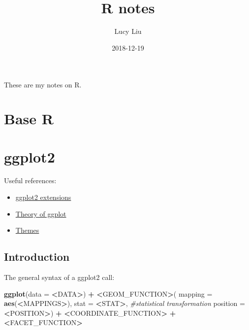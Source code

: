 \documentclass[]{book}
\title{R notes}
\author{Lucy Liu}
\date{2018-12-19}
\newenvironment{Shaded}{\begin{snugshade}}{\end{snugshade}}
\newcommand{\KeywordTok}[1]{\textcolor[rgb]{0.13,0.29,0.53}{\textbf{#1}}}
\newcommand{\DataTypeTok}[1]{\textcolor[rgb]{0.13,0.29,0.53}{#1}}
\newcommand{\StringTok}[1]{\textcolor[rgb]{0.31,0.60,0.02}{#1}}
\newcommand{\CommentTok}[1]{\textcolor[rgb]{0.56,0.35,0.01}{\textit{#1}}}
\newcommand{\OperatorTok}[1]{\textcolor[rgb]{0.81,0.36,0.00}{\textbf{#1}}}
\newcommand{\ErrorTok}[1]{\textcolor[rgb]{0.64,0.00,0.00}{\textbf{#1}}}
\newcommand{\NormalTok}[1]{#1}
\providecommand{\tightlist}{%
  \setlength{\itemsep}{0pt}\setlength{\parskip}{0pt}}
\begin{document}
\maketitle

{
\setcounter{tocdepth}{1}
\tableofcontents
}
These are my notes on R.

\chapter{Base R}\label{base-r}

\chapter{ggplot2}\label{ggplot2}

Useful references:

\begin{itemize}
\tightlist
\item
  \href{https://www.ggplot2-exts.org}{ggplot2 extensions}
\item
  \href{http://ggplot2.tidyverse.org/reference/}{Theory of ggplot}
\item
  \href{https://rstudio-pubs-static.s3.amazonaws.com/3364_d1a578f521174152b46b19d0c83cbe7e.html}{Themes}
\end{itemize}

\section{Introduction}\label{introduction}

The general syntax of a ggplot2 call:

\begin{Shaded}
\begin{Highlighting}[]
\KeywordTok{ggplot}\NormalTok{(}\DataTypeTok{data =} \OperatorTok{<}\NormalTok{DATA}\OperatorTok{>}\NormalTok{) }\OperatorTok{+}\StringTok{ }
\StringTok{  }\ErrorTok{<}\NormalTok{GEOM_FUNCTION}\OperatorTok{>}\NormalTok{(}
     \DataTypeTok{mapping =} \KeywordTok{aes}\NormalTok{(}\OperatorTok{<}\NormalTok{MAPPINGS}\OperatorTok{>}\NormalTok{),}
     \DataTypeTok{stat =} \OperatorTok{<}\NormalTok{STAT}\OperatorTok{>}\NormalTok{,    }\CommentTok{#statistical transformation}
     \DataTypeTok{position =} \OperatorTok{<}\NormalTok{POSITION}\OperatorTok{>}\NormalTok{) }\OperatorTok{+}
\StringTok{  }\ErrorTok{<}\NormalTok{COORDINATE_FUNCTION}\OperatorTok{>}\StringTok{ }\OperatorTok{+}
\StringTok{  }\ErrorTok{<}\NormalTok{FACET_FUNCTION}\OperatorTok{>}
\end{Highlighting}
\end{Shaded}
\end{document}
